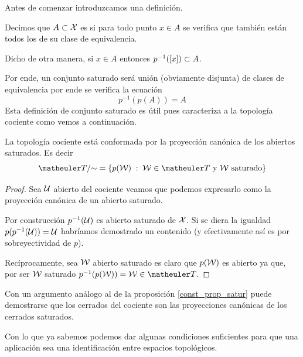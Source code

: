 Antes de comenzar introduzcamos una definición.
\begin{defi}
	Decimos que $A\subset\mathcal{X}$ es  si para todo punto $x\in A$ se verifica que también están todos los de su clase de equivalencia.
	
	Dicho de otra manera, si $x\in A$ entonces $p^{-1}(\left [ x \right ])\subset A$.
\end{defi}

Por ende, un conjunto saturado será unión (obviamente disjunta) de clases de equivalencia por ende se verifica la ecuación
\begin{equation}
p^{-1}(p(A))= A
\end{equation}
Esta definición de conjunto saturado es útil pues caracteriza a la topología cociente como vemos a continuación.
\begin{prop}
	\label{const_prop_satur}
	La topología cociente está conformada por la proyección canónica de los abiertos saturados. Es decir
	\[\T/\mathord{\sim} = \{p(\W)\midc \W\in\T\text{ y }\W\text{ saturado}\}\]
\end{prop}
\begin{proof}
	Sea $\mathcal{U}$ abierto del cociente veamos que podemos expresarlo como la proyección canónica de un abierto saturado.
	
	Por construcción $p^{-1}(\mathcal{U})$ es abierto saturado de $\mathcal{X}$. Si se diera la igualdad $p(p^{-1}(\mathcal{U}))=\mathcal{U}$ habríamos demostrado un contenido (y efectivamente así es por sobreyectividad de $p$).
	
	Recíprocamente, sea $\mathcal{W}$ abierto saturado es claro que $p(\mathcal{W})$ es abierto ya que, por ser $\mathcal{W}$ saturado $p^{-1}(p(\W))=\W\in\T$.
\end{proof}
\begin{obs}
	Con un argumento análogo al de la proposición \ref{const_prop_satur} puede demostrarse que los cerrados del cociente son las proyecciones canónicas de los cerrados saturados. 
\end{obs}
Con lo que ya sabemos podemos dar algunas condiciones suficientes para que una aplicación sea una identificación entre espacios topológicos.

